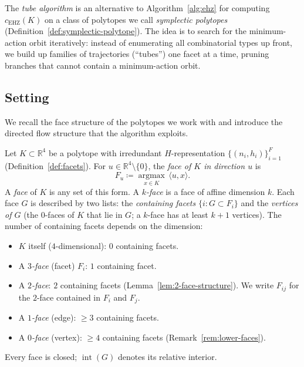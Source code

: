 The \emph{tube algorithm} is an alternative to Algorithm~\ref{alg:ehz}
for computing $c_{\mathrm{EHZ}}(K)$ on a class of polytopes
we call \emph{symplectic polytopes} (Definition~\ref{def:symplectic-polytope}).
The idea is to search for the minimum-action orbit iteratively:
instead of enumerating all combinatorial types up front,
we build up families of trajectories (``tubes'') one facet at a time,
pruning branches that cannot contain a minimum-action orbit.

\subsection{Setting}\label{subsec:tube-setting}

We recall the face structure of the polytopes we work with
and introduce the directed flow structure that the algorithm exploits.

\begin{definition}\label{def:faces}
Let $K \subset \mathbb{R}^4$ be a polytope
with irredundant $H$-representation
$\{(n_i, h_i)\}_{i=1}^{F}$ (Definition~\ref{def:facets}).
For $u \in \mathbb{R}^4 \setminus \{0\}$,
the \emph{face of $K$ in direction $u$} is
\[
  F_u \coloneqq \operatorname*{argmax}_{x \in K}\, \langle u, x \rangle.
\]
A \emph{face} of $K$ is any set of this form.
A \emph{$k$-face} is a face of affine dimension $k$.
Each face $G$ is described by two lists:
the \emph{containing facets} $\{i : G \subset F_i\}$
and the \emph{vertices of $G$}
(the $0$-faces of $K$ that lie in $G$;
a $k$-face has at least $k+1$ vertices).
The number of containing facets depends on the dimension:
\begin{itemize}
\item $K$ itself ($4$-dimensional): $0$ containing facets.
\item A \emph{$3$-face} (facet) $F_i$: $1$ containing facet.
\item A \emph{$2$-face}: $2$ containing facets
  (Lemma~\ref{lem:2-face-structure}).
  We write $F_{ij}$ for the $2$-face contained in $F_i$ and $F_j$.
\item A \emph{$1$-face} (edge): $\geq 3$ containing facets.
\item A \emph{$0$-face} (vertex): $\geq 4$ containing facets
  (Remark~\ref{rem:lower-faces}).
\end{itemize}
Every face is closed; $\operatorname{int}(G)$ denotes its relative interior.
\end{definition}

